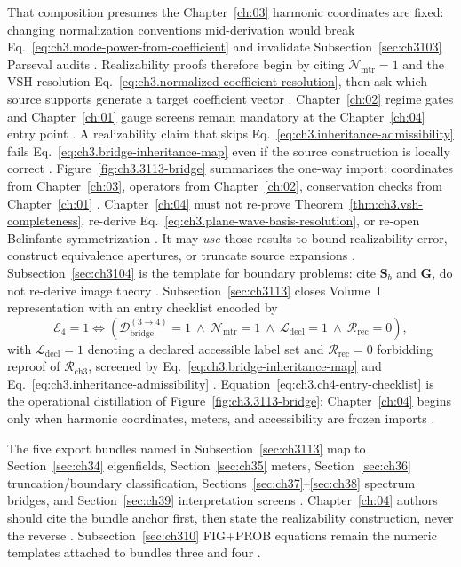 That composition presumes the Chapter~\ref{ch:03} harmonic coordinates are fixed: changing normalization conventions mid-derivation would break
Eq.~\eqref{eq:ch3.mode-power-from-coefficient} and invalidate Subsection~\ref{sec:ch3103} Parseval audits \cite{poynting1884}.
Realizability proofs therefore begin by citing \(\mathcal{N}_{\mathrm{mtr}}=1\) and the VSH resolution Eq.~\eqref{eq:ch3.normalized-coefficient-resolution},
then ask which source supports generate a target coefficient vector \cite{harrington2001}.
Chapter~\ref{ch:02} regime gates and Chapter~\ref{ch:01} gauge screens remain mandatory at the Chapter~\ref{ch:04} entry point \cite{belinfante1940}.
A realizability claim that skips Eq.~\eqref{eq:ch3.inheritance-admissibility} fails Eq.~\eqref{eq:ch3.bridge-inheritance-map} even if the source construction is
locally correct \cite{harrington2001}. Figure~\ref{fig:ch3.3113-bridge} summarizes the one-way import: coordinates from Chapter~\ref{ch:03},
operators from Chapter~\ref{ch:02}, conservation checks from Chapter~\ref{ch:01} \cite{stratton1941}.
Chapter~\ref{ch:04} must not re-prove Theorem~\ref{thm:ch3.vsh-completeness}, re-derive Eq.~\eqref{eq:ch3.plane-wave-basis-resolution}, or re-open
Belinfante symmetrization \cite{kato1995}. It may \emph{use} those results to bound realizability error, construct equivalence
apertures, or truncate source expansions \cite{devaney2004}. Subsection~\ref{sec:ch3104} is the template for boundary
problems: cite \(\mathbf{S}_{b}\) and \(\mathbf{G}\), do not re-derive image theory \cite{jackson1999}.
Subsection~\ref{sec:ch3113} closes Volume~I representation with an entry checklist encoded by
\begin{equation}
\label{eq:ch3.ch4-entry-checklist}
\mathcal{E}_{4}=1
\iff
\left(
\mathcal{D}_{\mathrm{bridge}}^{(3\to4)}=1\
\wedge\
\mathcal{N}_{\mathrm{mtr}}=1\
\wedge\
\mathcal{L}_{\mathrm{decl}}=1\
\wedge\
\mathcal{R}_{\mathrm{rec}}=0
\right),
\end{equation}
with \(\mathcal{L}_{\mathrm{decl}}=1\) denoting a declared accessible label set and \(\mathcal{R}_{\mathrm{rec}}=0\) forbidding reproof of \(\mathcal{R}_{\mathrm{ch3}}\), screened by Eq.~\eqref{eq:ch3.bridge-inheritance-map} and Eq.~\eqref{eq:ch3.inheritance-admissibility}
\cite{stratton1941}. Equation~\eqref{eq:ch3.ch4-entry-checklist} is the operational distillation of Figure~\ref{fig:ch3.3113-bridge}: Chapter~\ref{ch:04} begins only when harmonic coordinates, meters, and accessibility are frozen imports
\cite{hansen1988}.

The five export bundles named in Subsection~\ref{sec:ch3113} map to Section~\ref{sec:ch34} eigenfields, Section~\ref{sec:ch35} meters, Section~\ref{sec:ch36} truncation/boundary classification, Sections~\ref{sec:ch37}--\ref{sec:ch38} spectrum bridges, and Section~\ref{sec:ch39} interpretation screens
\cite{hansen1988}. Chapter~\ref{ch:04} authors should cite the bundle anchor first, then state the realizability construction, never the reverse
\cite{stratton1941}. Subsection~\ref{sec:ch310} FIG+PROB equations remain the numeric templates attached to bundles three and four
\cite{harrington2001}.

